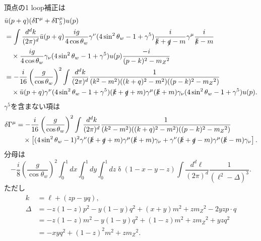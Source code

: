 頂点の1 loop補正は
\begin{align*}
  & \bar{u}(p+q) (\delta\Gamma^\mu+\delta\Gamma_5^\mu) u(p) \\
  &= \int \frac{d^dk}{(2\pi)^d} \bar{u}(p+q) \frac{ig}{4\cos\theta_w} \gamma^\nu (4\sin^2\theta_w-1+\gamma^5)
  \frac{i}{\slashed{k}+\slashed{q}-m} \gamma^\mu \frac{i}{\slashed{k}-m} \\
  &\quad \times\frac{ig}{4\cos\theta_w} \gamma_\nu (4\sin^2\theta_w-1+\gamma^5) u(p) \frac{-i}{(p-k)^2-m_Z{}^2} \\
  &= -\frac{i}{16} \left(\frac{g}{\cos\theta_w}\right)^2
  \int\frac{d^dk}{(2\pi)^d} \frac{1}{(k^2-m^2) ((k+q)^2-m^2) ((p-k)^2 - m_Z{}^2)} \\
  &\quad\times \bar{u}(p+q) \gamma^\nu (4\sin^2\theta_w-1+\gamma^5)(\slashed{k}+\slashed{q}+m) \gamma^\mu (\slashed{k}+m) \gamma_\nu (4\sin^2\theta_w-1+\gamma^5) u(p).
\end{align*}
\(\gamma^5\)を含まない項は
\begin{align*}
  \delta\Gamma^\mu
  &= -\frac{i}{16} \left(\frac{g}{\cos\theta_w}\right)^2
  \int\frac{d^dk}{(2\pi)^d} \frac{1}{(k^2-m^2) ((k+q)^2-m^2) ((p-k)^2 - m_Z{}^2)} \\
  &\quad\times
  \left[ (4\sin^2\theta_w-1)^2 \gamma^\nu (\slashed{k}+\slashed{q}+m) \gamma^\mu (\slashed{k}+m) \gamma_\nu
  + \gamma^\nu (\slashed{k}+\slashed{q}-m) \gamma^\mu (\slashed{k}-m) \gamma_\nu \right] .
\end{align*}
分母は
\[
-\frac{i}{8} \left(\frac{g}{\cos\theta_w}\right)^2 \int_0^1 dx \int_0^1 dy \int_0^1 dz \mathop{\delta}(1-x-y-z) \int\frac{d^d\ell}{(2\pi)^d} \frac{1}{(\ell^2-\Delta)^3} .
\]
ただし
\begin{align*}
  k &= \ell + (zp-yq) , \\
  \Delta &= -z(1-z)p^2 - y(1-y)q^2 + (x+y)m^2 + zm_Z{}^2 - 2yzp\cdot q \\
  &= -z(1-z)m^2 - y(1-y)q^2 + (1-z)m^2 + zm_Z{}^2 + yzq^2 \\
  &= - xy q^2 + (1-z)^2m^2 + zm_Z{}^2 .
\end{align*}

